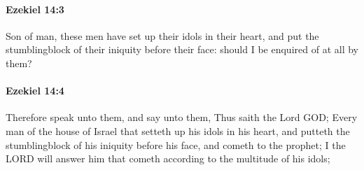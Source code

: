 		\paragraph{Ezekiel 14:3} %
			\label{EZEKIEL-14-3}

			Son of man, these men have set up their idols in their heart, and put the stumblingblock of their iniquity before their face: should I be enquired of at all by them?


		\paragraph{Ezekiel 14:4} %
			\label{EZEKIEL-14-4}

			Therefore speak unto them, and say unto them, Thus saith the Lord GOD; Every man of the house of Israel that setteth up his idols in his heart, and putteth the stumblingblock of his iniquity before his face, and cometh to the prophet; I the LORD will answer him that cometh according to the multitude of his idols;

